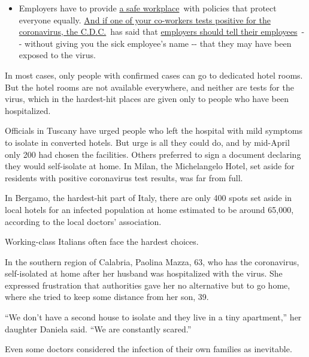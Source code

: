 \begin{itemize}
  \begin{itemize}
  \tightlist
  \item
    Employers have to provide
    \href{https://www.osha.gov/SLTC/covid-19/standards.html}{a safe
    workplace}~with policies that protect everyone equally.
    \href{https://www.nytimes3xbfgragh.onion/article/coronavirus-money-unemployment.html?action=click\&pgtype=Article\&state=default\&region=MAIN_CONTENT_3\&context=storylines_faq}{And
    if one of your co-workers tests positive for the coronavirus, the
    C.D.C.}~has said that
    \href{https://www.cdc.gov/coronavirus/2019-ncov/community/guidance-business-response.html}{employers
    should tell their employees}~-\/- without giving you the sick
    employee's name -\/- that they may have been exposed to the virus.
  \end{itemize}
\end{itemize}

In most cases, only people with confirmed cases can go to dedicated
hotel rooms. But the hotel rooms are not available everywhere, and
neither are tests for the virus, which in the hardest-hit places are
given only to people who have been hospitalized.

Officials in Tuscany have urged people who left the hospital with mild
symptoms to isolate in converted hotels. But urge is all they could do,
and by mid-April only 200 had chosen the facilities. Others preferred to
sign a document declaring they would self-isolate at home. In Milan, the
Michelangelo Hotel, set aside for residents with positive coronavirus
test results, was far from full.

In Bergamo, the hardest-hit part of Italy, there are only 400 spots set
aside in local hotels for an infected population at home estimated to be
around 65,000, according to the local doctors' association.

Working-class Italians often face the hardest choices.

In the southern region of Calabria, Paolina Mazza, 63, who has the
coronavirus, self-isolated at home after her husband was hospitalized
with the virus. She expressed frustration that authorities gave her no
alternative but to go home, where she tried to keep some distance from
her son, 39.

``We don't have a second house to isolate and they live in a tiny
apartment,'' her daughter Daniela said. ``We are constantly scared.''

Even some doctors considered the infection of their own families as
inevitable.

